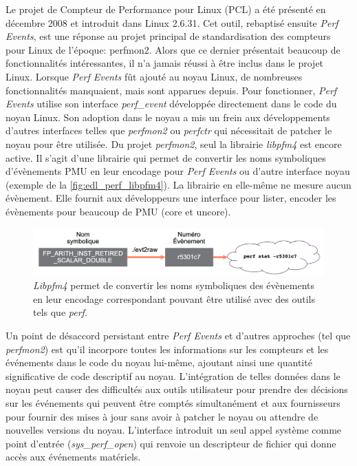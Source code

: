             Le projet de Compteur de Performance pour Linux (PCL) a été présenté en décembre 2008 et introduit dans Linux 2.6.31. Cet outil, rebaptisé ensuite \textit{Perf Events}, est une réponse au projet principal de standardisation des compteurs pour Linux de l'époque: perfmon2. Alors que ce dernier présentait beaucoup de fonctionnalités intéressantes, il n'a jamais réussi à être inclus dans le projet Linux. Lorsque \textit{Perf Events} fût ajouté au noyau Linux, de nombreuses fonctionnalités manquaient, mais sont apparues depuis. Pour fonctionner, \textit{Perf Events} utilise son interface \textit{perf\_event} développée directement dans le code du noyau Linux. Son adoption dans le noyau a mis un frein aux développements d'autres interfaces telles que \textit{perfmon2} ou \textit{perfctr} qui nécessitait de patcher le noyau pour être utilisée.  Du projet \textit{perfmon2}, seul la librairie \textit{libpfm4} est encore active. Il s'agit d'une librairie qui permet de convertir les noms symboliques d'évènements PMU en leur encodage pour \textit{Perf Events} ou d'autre interface noyau (exemple de la \autoref{fig:edl_perf_libpfm4}). La librairie en elle-même ne mesure aucun évènement. Elle fournit aux développeurs une interface pour lister, encoder les évènements pour beaucoup de PMU (core et uncore).
            
            \begin{figure}[h!]
            \center
            \includegraphics[width=12cm]{images/edl_perf_libpfm4.png}
            \caption{\label{fig:edl_perf_libpfm4} \textit{Libpfm4} permet de convertir les noms symboliques des évènements en leur encodage correspondant pouvant être utilisé avec des outils tels que \textit{perf}.}
            \end{figure}
            
            
            Un point de désaccord persistant entre \textit{Perf Events} et d'autres approches (tel que \textit{perfmon2}) est qu'il incorpore toutes les informations sur les compteurs et les événements dans le code du noyau lui-même, ajoutant ainsi une quantité significative de code descriptif au noyau. L'intégration de telles données dans le noyau peut causer des difficultés aux outils utilisateur pour prendre des décisions sur les événements qui peuvent être comptés simultanément et aux fournisseurs pour fournir des mises à jour sans avoir à patcher le noyau ou attendre de nouvelles versions du noyau. L'interface introduit un seul appel système comme point d'entrée (\textit{sys\_perf\_open}) qui renvoie un descripteur de fichier qui donne accès aux événements matériels. 
            

